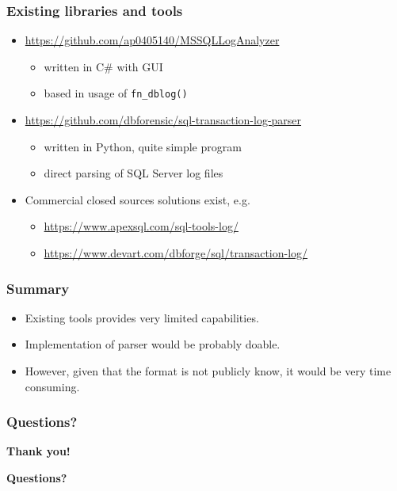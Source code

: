 \documentclass[10pt,utf8]{beamer}
\begin{document}
\begin{frame}
    \frametitle{Existing libraries and tools}
    \begin{itemize}
        \item \color{blue}\url{https://github.com/ap0405140/MSSQLLogAnalyzer}\color{black}
        \begin{itemize}
            \item written in C\# with GUI
            \item based in usage of \texttt{fn\_dblog()}
        \end{itemize}
        \item \color{blue}\url{https://github.com/dbforensic/sql-transaction-log-parser}\color{black}
        \begin{itemize}
            \item written in Python, quite simple program
            \item direct parsing of SQL Server log files
        \end{itemize}
        \item Commercial closed sources solutions exist, e.g.
        \begin{itemize}
            \item \color{blue}\url{https://www.apexsql.com/sql-tools-log/}\color{black}
            \item \color{blue}\url{https://www.devart.com/dbforge/sql/transaction-log/}\color{black}
        \end{itemize}
    \end{itemize}
\end{frame}


\begin{frame}
    \frametitle{Summary}
    \begin{itemize}
        \item Existing tools provides very limited capabilities.
        \item Implementation of parser would be probably doable.
        \item However, given that the format is not publicly know, it would be very time consuming.
    \end{itemize}
\end{frame}

\begin{frame}
    \frametitle{Questions?}
    \centering
     \textbf{\Huge{Thank you!}}
    
    \vspace{1.5cm}
    
    \textbf{\Huge{Questions?}}
    
    \vspace{1cm}
\end{frame}


\end{document}
